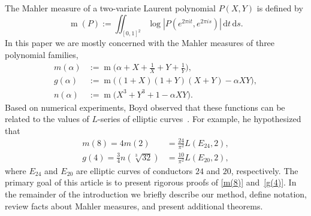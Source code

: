 \documentclass[12pt,reqno]{amsart}
\theoremstyle{remark}
\begin{document}
The Mahler measure of a two-variate Laurent polynomial $P(X,Y)$ is defined by
$$
{{\operatorname{m}}}(P):=\iint_{[0,1]^2}\log|P(e^{2\pi it},e^{2\pi is})|\,{{\mathrm d}} t\,{{\mathrm d}} s.
$$
In this paper we are mostly concerned with the Mahler measures of
three polynomial families,
\begin{align*}
m(\alpha)&:={{\operatorname{m}}}\biggl(\alpha+X+\frac{1}{X}+Y+\frac{1}{Y}\biggr),
\\
g(\alpha)&:={{\operatorname{m}}}\bigl((1+X)(1+Y)(X+Y)-\alpha XY\bigr),
\\
n(\alpha)&:={{\operatorname{m}}}\bigl(X^3+Y^3+1-\alpha XY).
\end{align*}
Based on numerical experiments, Boyd observed that these functions
can be related to the values of $L$-series of elliptic
curves~\cite{Bo1}. For example, he hypothesized that
\begin{align}
m(8)=4m(2)&=\frac{24}{\pi^2}L(E_{24},2), \label{m(8)}
\\
g(4)=\frac34n(\sqrt[3]{32}) &=\frac{10}{\pi^2}L(E_{20},2),
\label{g(4)}
\end{align}
where $E_{24}$ and $E_{20}$ are elliptic curves of conductors $24$
and $20$, respectively. The primary goal of this article is to
present rigorous proofs of \eqref{m(8)} and~\eqref{g(4)}.  In the
remainder of the introduction we briefly describe our method, define
notation, review facts about Mahler measures, and present additional
theorems.
\end{document}
